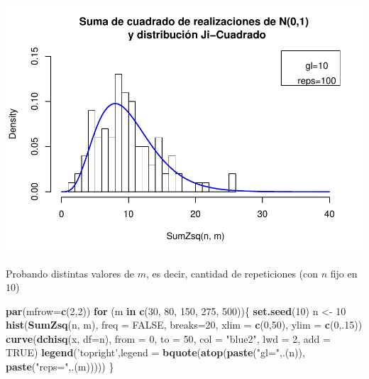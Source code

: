 \documentclass[]{article}
\newenvironment{Shaded}{\begin{snugshade}}{\end{snugshade}}
\newcommand{\ControlFlowTok}[1]{\textcolor[rgb]{0.13,0.29,0.53}{\textbf{#1}}}
\newcommand{\DataTypeTok}[1]{\textcolor[rgb]{0.13,0.29,0.53}{#1}}
\newcommand{\DecValTok}[1]{\textcolor[rgb]{0.00,0.00,0.81}{#1}}
\newcommand{\KeywordTok}[1]{\textcolor[rgb]{0.13,0.29,0.53}{\textbf{#1}}}
\newcommand{\NormalTok}[1]{#1}
\newcommand{\OtherTok}[1]{\textcolor[rgb]{0.56,0.35,0.01}{#1}}
\newcommand{\StringTok}[1]{\textcolor[rgb]{0.31,0.60,0.02}{#1}}
\begin{document}
\includegraphics{NotaDeClaseLong_files/figure-latex/unnamed-chunk-11-1.pdf}

Probando distintas valores de \(m\), es decir, cantidad de repeticiones
(con \(n\) fijo en \(10\))

\begin{Shaded}
\begin{Highlighting}[]
\KeywordTok{par}\NormalTok{(}\DataTypeTok{mfrow=}\KeywordTok{c}\NormalTok{(}\DecValTok{2}\NormalTok{,}\DecValTok{2}\NormalTok{))}
\ControlFlowTok{for}\NormalTok{ (m }\ControlFlowTok{in} \KeywordTok{c}\NormalTok{(}\DecValTok{30}\NormalTok{, }\DecValTok{80}\NormalTok{, }\DecValTok{150}\NormalTok{, }\DecValTok{275}\NormalTok{, }\DecValTok{500}\NormalTok{))\{}
  \KeywordTok{set.seed}\NormalTok{(}\DecValTok{10}\NormalTok{)}
\NormalTok{  n <-}\StringTok{ }\DecValTok{10}
  \KeywordTok{hist}\NormalTok{(}\KeywordTok{SumZsq}\NormalTok{(n, m), }\DataTypeTok{freq =} \OtherTok{FALSE}\NormalTok{, }\DataTypeTok{breaks=}\DecValTok{20}\NormalTok{,}
       \DataTypeTok{xlim =} \KeywordTok{c}\NormalTok{(}\DecValTok{0}\NormalTok{,}\DecValTok{50}\NormalTok{), }\DataTypeTok{ylim =} \KeywordTok{c}\NormalTok{(}\DecValTok{0}\NormalTok{,.}\DecValTok{15}\NormalTok{))}
  \KeywordTok{curve}\NormalTok{(}\KeywordTok{dchisq}\NormalTok{(x, }\DataTypeTok{df=}\NormalTok{n),}
        \DataTypeTok{from =} \DecValTok{0}\NormalTok{, }\DataTypeTok{to =} \DecValTok{50}\NormalTok{,}
        \DataTypeTok{col  =} \StringTok{"blue2"}\NormalTok{,}
        \DataTypeTok{lwd  =} \DecValTok{2}\NormalTok{,}
        \DataTypeTok{add  =} \OtherTok{TRUE}\NormalTok{) }
  \KeywordTok{legend}\NormalTok{(}\StringTok{'topright'}\NormalTok{,}\DataTypeTok{legend =}  \KeywordTok{bquote}\NormalTok{(}\KeywordTok{atop}\NormalTok{(}\KeywordTok{paste}\NormalTok{(}\StringTok{"gl="}\NormalTok{,.(n)), }\KeywordTok{paste}\NormalTok{(}\StringTok{"reps="}\NormalTok{,.(m)))))}
\NormalTok{\}}
\end{Highlighting}
\end{Shaded}
\end{document}
